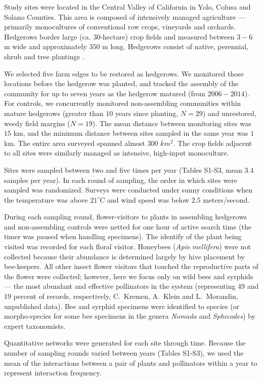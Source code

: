 \documentclass[12pt]{article}
\begin{document}
Study sites were located in the Central Valley of California in Yolo,
Colusa and Solano Counties. This area is composed of intensively
managed agriculture --- primarily monocultures of conventional row
crops, vineyards and orchards. Hedgerows border large
(ca. $30$-hectare) crop fields and measured between $3-6$ m wide and
approximately $350$ m long. Hedgerows consist of native, perennial,
shrub and tree plantings \citep[Fig.~S1, ][]{menz-2010-4,
  kremen-2015-602, mgonigle-2015-x}.

We selected five farm edges to be restored as hedgerows. We monitored
those locations before the hedgerow was planted, and tracked the
assembly of the community for up to seven years as the hedgerow
matured (from $2006-2014$). For controls, we concurrently monitored
non-assembling communities within mature hedgerows (greater than $10$
years since planting, $N=29$) and unrestored, weedy field margins
($N=19$). The mean distance between monitoring sites was $15$ km, and
the minimum distance between sites sampled in the same year was $1$
km. The entire area surveyed spanned almost $300$ $km^2$. The crop
fields adjacent to all sites were similarly managed as intensive,
high-input monoculture.

Sites were sampled between two and five times per year (Tables S1-S3,
mean $3.4$ samples per year). In each round of sampling, the order in
which sites were sampled was randomized. Surveys were conducted under
sunny conditions when the temperature was above $21^{\circ}\mathrm{C}$
and wind speed was below $2.5$ meters/second.

During each sampling round, flower-visitors to plants in assembling
hedgerows and non-assembling controls were netted for one hour of
active search time (the timer was paused when handling specimens). The
identify of the plant being visited was recorded for each floral
visitor. Honeybees (\textit{Apis mellifera}) were not collected
because their abundance is determined largely by hive placement by
bee-keepers. All other insect flower visitors that touched the
reproductive parts of the flower were collected; however, here we
focus only on wild bees and syrphids --- the most abundant and
effective pollinators in the system (representing 49 and 19 percent of
records, respectively, C.~Kremen, A.~Klein and L.~Morandin,
unpublished data). Bee and syrphid specimens were identified to
species (or morpho-species for some bee specimens in the genera
\textit{Nomada} and \textit{Sphecodes}) by expert taxonomists.

Quantitative networks were generated for each site through
time. Because the number of sampling rounds varied between years
(Tables S1-S3), we used the mean of the interactions between a pair of
plants and pollinators within a year to represent interaction
frequency.
\end{document}
